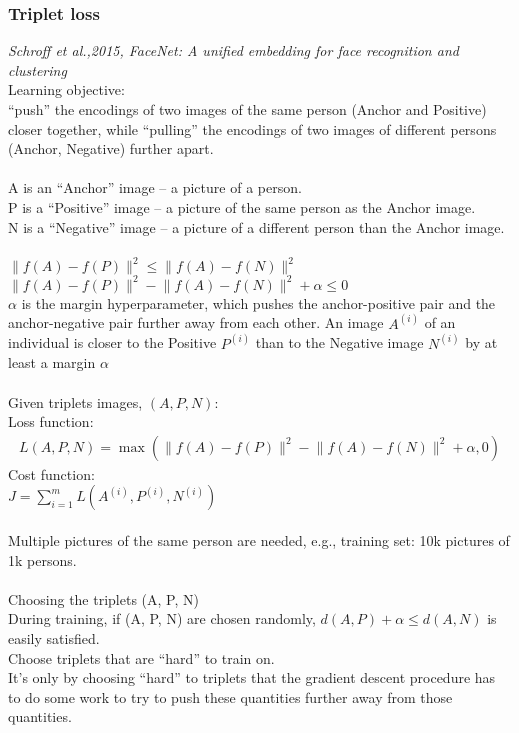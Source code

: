 \subsubsection{Triplet loss}
\textit{Schroff et al.,2015, FaceNet: A unified embedding for face recognition and clustering}\\
Learning objective:\\
``push'' the encodings of two images of the same person (Anchor and Positive) closer together, while ``pulling'' the encodings of two images of different persons (Anchor, Negative) further apart.\\
\\
A is an ``Anchor'' image -- a picture of a person.\\
P is a ``Positive'' image -- a picture of the same person as the Anchor image.\\
N is a ``Negative'' image -- a picture of a different person than the Anchor image.\\
\\
$\lVert f(A) - f(P) \rVert^2 \le \lVert f(A) - f(N) \rVert^2$\\
$\lVert f(A) - f(P) \rVert^2 - \lVert f(A) - f(N) \rVert^2 + \alpha \le  0$\\
$\alpha$ is the margin hyperparameter, which pushes the anchor-positive pair and the anchor-negative pair further away from each other. An image $A^{(i)}$  of an individual is closer to the Positive  $P^{(i)}$ than to the Negative image  $N^{(i)}$ by at least a margin $\alpha$\\
\\
Given triplets images, $(A, P, N)$:\\
Loss function:
\begin{align}
L(A,P,N) = \max(\lVert f(A) - f(P) \rVert^2 - \lVert f(A) - f(N) \rVert^2 + \alpha,  0)
\end{align}
Cost function:\\
$J = \sum_{i=1}^{m}L(A^{(i)},P^{(i)},N^{(i)})$\\
\\
Multiple pictures of the same person are needed, e.g., training set: 10k pictures of 1k persons.\\
\\
Choosing the triplets (A, P, N)\\
During training, if (A, P, N) are chosen randomly, $d(A,P) + \alpha \le d(A,N)$ is easily satisfied.\\
Choose triplets that are ``hard'' to train on.\\
It's only by choosing ``hard'' to triplets that the gradient descent procedure has to do some work to try to push these quantities further away from those quantities.

